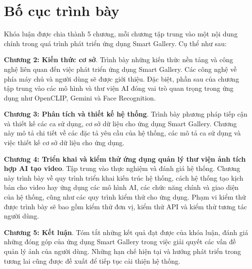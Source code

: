 \section{Bố cục trình bày}
Khóa luận được chia thành 5 chương, mỗi chương tập trung vào một nội dung chính trong quá trình phát triển ứng dụng Smart Gallery. Cụ thể như sau:

\textbf{Chương 2: Kiến thức cơ sở}. Trình bày những kiến thức nền tảng và công nghệ liên quan đến việc phát triển ứng dụng Smart Gallery. Các công nghệ về phía máy chủ và người dùng sẽ được giới thiệu. Đặc biệt, phần sau của chương tập trung vào các mô hình và thư viện AI đóng vai trò quan trọng trong ứng dụng như OpenCLIP, Gemini và Face Recognition.

\textbf{Chương 3: Phân tích và thiết kế hệ thống}. Trình bày phương pháp tiếp cận và thiết kế các ca sử dụng, cơ sở dữ liệu cho ứng dụng Smart Gallery. Chương này mô tả chi tiết về các đặc tả yêu cầu của hệ thống, các mô tả ca sử dụng và việc thiết kế cơ sở dữ liệu cho ứng dụng. 

\textbf{Chương 4: Triển khai và kiểm thử ứng dụng quản lý thư viện ảnh tích hợp AI tạo video}. Tập trung vào thực nghiệm và đánh giá hệ thống. Chương này trình bày về quy trình triển khai kiến trúc hệ thống, cách hệ thống tạo kịch bản cho video hay ứng dụng các mô hình AI, các chức năng chính và giao diện của hệ thống, cũng như các quy trình kiểm thử cho ứng dụng. Phạm vi kiểm thử được trình bày sẽ bao gồm kiểm thử đơn vị, kiểm thử API và kiểm thử tương tác người dùng. 

\textbf{Chương 5: Kết luận}. Tóm tắt những kết quả đạt được của khóa luận, đánh giá những đóng góp của ứng dụng Smart Gallery trong việc giải quyết các vấn đề quản lý ảnh của người dùng. Những hạn chế hiện tại và hướng phát triển trong tương lai cũng được đề xuất để tiếp tục cải thiện hệ thống.